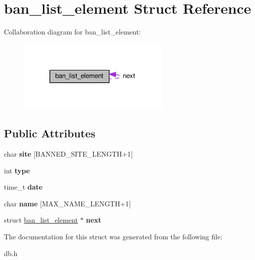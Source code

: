 \hypertarget{structban__list__element}{}\section{ban\+\_\+list\+\_\+element Struct Reference}
\label{structban__list__element}


Collaboration diagram for ban\+\_\+list\+\_\+element\+:\nopagebreak
\begin{figure}[H]
\begin{center}
\leavevmode
\includegraphics[width=210pt]{structban__list__element__coll__graph}
\end{center}
\end{figure}
\subsection*{Public Attributes}
\begin{DoxyCompactItemize}
\item 
\mbox{\label{structban__list__element_a62b7fad7417e89973ed3ed464e5fb40f}} 
char {\bfseries site} \mbox{[}B\+A\+N\+N\+E\+D\+\_\+\+S\+I\+T\+E\+\_\+\+L\+E\+N\+G\+TH+1\mbox{]}
\item 
\mbox{\label{structban__list__element_ac3c01af37fb9d47f1e0062725dc308c4}} 
int {\bfseries type}
\item 
\mbox{\label{structban__list__element_a22875f625f142580a1c7c0cf5ce19b0f}} 
time\+\_\+t {\bfseries date}
\item 
\mbox{\label{structban__list__element_a379a18a30e89950584e1e62db3aaed21}} 
char {\bfseries name} \mbox{[}M\+A\+X\+\_\+\+N\+A\+M\+E\+\_\+\+L\+E\+N\+G\+TH+1\mbox{]}
\item 
\mbox{\label{structban__list__element_aae37b7c3462b0271e4f5c0e1715ecb7f}} 
struct \hyperlink{structban__list__element}{ban\+\_\+list\+\_\+element} $\ast$ {\bfseries next}
\end{DoxyCompactItemize}


The documentation for this struct was generated from the following file\+:\begin{DoxyCompactItemize}
\item 
db.\+h\end{DoxyCompactItemize}
